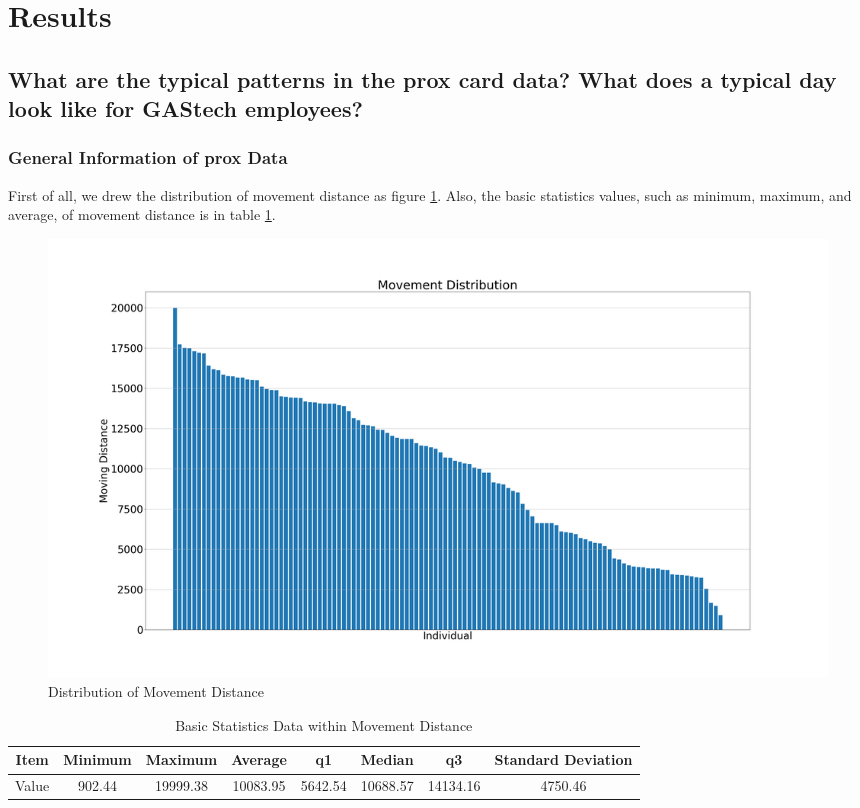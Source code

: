 \documentclass[aps, 10pt, a4paper]{article}
\begin{document}
    \section{Results}
        \subsection[Question 1]{What are the typical patterns in the prox card data? What does a typical day look like for GAStech employees?}
            \label{sec:question1}
            \subsubsection{General Information of prox Data}
                First of all, we drew the distribution of movement distance as figure \ref{fig:movementdist}. Also, the basic statistics values, such as minimum, maximum, and average, of movement distance is in table \ref{tb:movementdist}.
            
                \begin{figure}[htbp]
                    \centering
                    \includegraphics[width=0.6 \linewidth]{figures/movementdistribution.png}
                    \caption{Distribution of Movement Distance}
                    \label{fig:movementdist}
                \end{figure}
        
                \begin{table}[htbp]
                    \centering
                    \caption{Basic Statistics Data within Movement Distance}
                    \label{tb:movementdist}
                    \begin{tabular}{c||c|c|c|c|c|c|c}
                        Item & Minimum & Maximum & Average & q1 & Median & q3 & Standard Deviation \\ \hline
                        Value & 902.44 & 19999.38 & 10083.95 & 5642.54 & 10688.57 & 14134.16 & 4750.46 \\
                    \end{tabular}
                \end{table}
            
\end{document}

